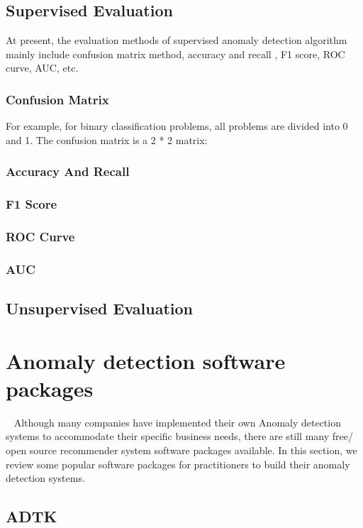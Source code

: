 \subsection{Supervised Evaluation}
At present, the evaluation methods of supervised 
anomaly detection algorithm mainly include 
confusion matrix method,
accuracy  and recall , 
F1 score, 
ROC curve, 
AUC, 
etc.
\subsubsection{Confusion Matrix}
For example, 
for binary classification problems, 
all problems are divided into 0 and 1. 
The confusion matrix is a 2 * 2 matrix:


\subsubsection{Accuracy  And Recall}
\subsubsection{F1 Score}
\subsubsection{ROC Curve}
\subsubsection{AUC}

\subsection{Unsupervised Evaluation}







\section{Anomaly detection software packages}~\label{sec:tools}
Although many companies have implemented their own Anomaly detection systems
to accommodate their specific business needs,
there are still many free/ open source recommender system
software packages available.
In this section,
we review some popular software packages for practitioners
to build their anomaly detection systems.

\subsection{ADTK}

